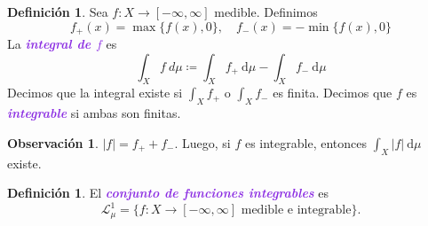 \documentclass{article}
\theoremstyle{definition}
\newtheorem{definition}[theorem]{Definición}
\newtheorem*{obs}{Observación}
\theoremstyle{remark}
\numberwithin{equation}{section}
\newcommand{\oo}{\infty}
\newcommand{\abs}[1]{\left| #1 \right|}
\newcommand{\ds}{\displaystyle}
\newcommand{\wea}[1]{\textcolor{BlueViolet}{\textbf{\emph{#1}}}}
\begin{document}
\begin{definition}
  Sea $f \colon X \to [-\oo,\oo]$ medible. Definimos 
  \[ f_+(x) = \max\{f(x),0\}, \quad f_-(x) = -\min\{f(x),0\} \]
  La \wea{integral de $f$} es 
  \[ \int_X f \ d\mu \coloneqq \int_X f_+ \ \mathrm{d}\mu - \int_X f_- \ \mathrm{d}\mu \]
  Decimos que la integral existe si $\ds \int_X f_+$ o $\ds \int_X f_-$ es finita. Decimos que $f$ es \wea{integrable} si ambas son finitas.
\end{definition}

\begin{obs}
  $\abs f = f_+ + f_-$. Luego, si $f$ es integrable, entonces $\ds \int_X \abs f \ \mathrm{d}\mu$ existe.
\end{obs}

\begin{definition}
  El \wea{conjunto de funciones integrables} es 
  \[ \mathcal{L }_\mu^1 = \{f \colon X \to [-\oo,\oo] \text{ medible e integrable}\}. \]
\end{definition}
\end{document}
